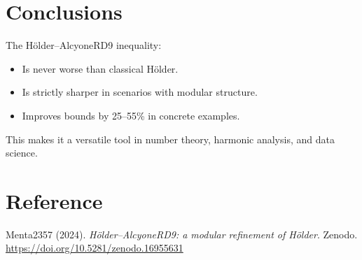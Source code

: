 \documentclass[12pt,a4paper]{article}
\theoremstyle{plain}
\begin{document}
\section{Conclusions}
The Hölder–AlcyoneRD9 inequality:
\begin{itemize}
    \item Is never worse than classical Hölder.
    \item Is strictly sharper in scenarios with modular structure.
    \item Improves bounds by 25--55\% in concrete examples.
\end{itemize}

This makes it a versatile tool in number theory, harmonic analysis, and data science.

\section*{Reference}
Menta2357 (2024). \emph{Hölder–AlcyoneRD9: a modular refinement of Hölder}. Zenodo. \url{https://doi.org/10.5281/zenodo.16955631}
\end{document}
